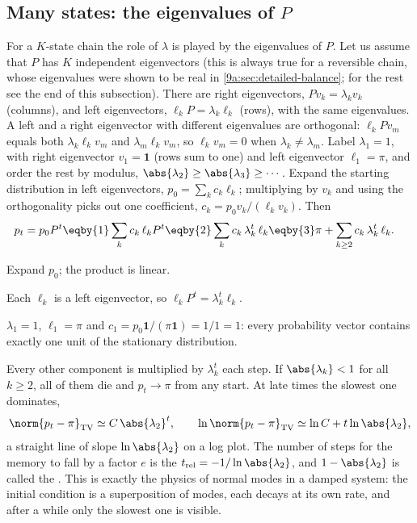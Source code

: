 \subsection{Many states: the eigenvalues of $P$}
\label{9a:sec:eigen}

For a $K$-state chain the role of $\lambda$ is played by the eigenvalues of $P$. Let us assume
that $P$ has $K$ independent eigenvectors (this is always true for a reversible chain, whose
eigenvalues were shown to be real in \cref{9a:sec:detailed-balance}; for the rest see the end of
this subsection). There are right eigenvectors, $Pv_k=\lambda_kv_k$ (columns), and left
eigenvectors, $\ell_kP=\lambda_k\ell_k$ (rows), with the same eigenvalues. A left and a right
eigenvector with different eigenvalues are orthogonal: $\ell_kPv_m$ equals both $\lambda_k\ell_kv_m$
and $\lambda_m\ell_kv_m$, so $\ell_kv_m=0$ when $\lambda_k\ne\lambda_m$. Label $\lambda_1=1$,
with right eigenvector $v_1=\mathbf1$ (rows sum to one) and left eigenvector $\ell_1=\pi$, and
order the rest by modulus, $\abs{\lambda_2}\ge\abs{\lambda_3}\ge\cdots$. Expand the starting
distribution in left eigenvectors, $p_0=\sum_kc_k\ell_k$; multiplying by $v_k$ and using the
orthogonality picks out one coefficient, $c_k=p_0v_k/(\ell_kv_k)$. Then
\begin{align}
  p_t=p_0P^t
  &\eqby{1}\sum_kc_k\,\ell_kP^t
   \eqby{2}\sum_kc_k\,\lambda_k^t\,\ell_k
   \eqby{3}\pi+\sum_{k\ge2}c_k\,\lambda_k^t\,\ell_k .
  \label{9a:eq:spectral}
\end{align}
\begin{explain}
  \item Expand $p_0$; the product is linear.
  \item Each $\ell_k$ is a left eigenvector, so $\ell_kP^t=\lambda_k^t\ell_k$.
  \item $\lambda_1=1$, $\ell_1=\pi$ and
        $c_1=p_0\mathbf1/(\pi\mathbf1)=1/1=1$: every probability vector contains exactly one
        unit of the stationary distribution.
\end{explain}
Every other component is multiplied by $\lambda_k^t$ each step. If $\abs{\lambda_k}<1$ for all
$k\ge2$, all of them die and $p_t\to\pi$ from any start. At late times the slowest one
dominates,
\begin{equation}
  \norm{p_t-\pi}_{\rm TV}\simeq C\,\abs{\lambda_2}^t,
  \qquad
  \ln\norm{p_t-\pi}_{\rm TV}\simeq\ln C+t\ln\abs{\lambda_2},
  \label{9a:eq:lambda2-rate}
\end{equation}
a straight line of slope $\ln\abs{\lambda_2}$ on a log plot. The number of steps for the
memory to fall by a factor $e$ is the 
$t_{\rm rel}=-1/\ln\abs{\lambda_2}$, and $1-\abs{\lambda_2}$ is called the . This is exactly the physics of normal modes in a damped system: the initial condition is
a superposition of modes, each decays at its own rate, and after a while only the slowest one
is visible.

